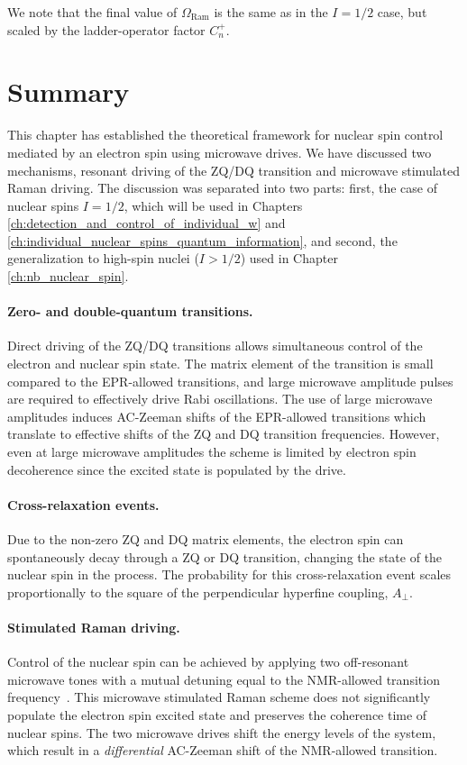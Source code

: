 We note that the final value of $\Omega_{\mathrm{Ram}}$ is the same as in the $I=1/2$ case, but scaled by the ladder-operator factor $C^+_n$.

\section{Summary}

This chapter has established the theoretical framework for nuclear spin control mediated by an electron spin using microwave drives. We have discussed two mechanisms, resonant driving of the ZQ/DQ transition and microwave stimulated Raman driving. The discussion was separated into two parts: first, the case of nuclear spins $I=1/2$, which will be used in Chapters \ref{ch:detection_and_control_of_individual_w} and \ref{ch:individual_nuclear_spins_quantum_information}, and second, the generalization to high-spin nuclei ($I>1/2$) used in Chapter \ref{ch:nb_nuclear_spin}.  

\paragraph{Zero- and double-quantum transitions.} Direct driving of the ZQ/DQ transitions allows simultaneous control of the electron and nuclear spin state. The matrix element of the transition is small compared to the EPR-allowed transitions, and large microwave amplitude pulses are required to effectively drive Rabi oscillations. The use of large microwave amplitudes induces AC-Zeeman shifts of the EPR-allowed transitions which translate to effective shifts of the ZQ and DQ transition frequencies. However, even at large microwave amplitudes the scheme is limited by electron spin decoherence since the excited state is populated by the drive.

\paragraph{Cross-relaxation events.} Due to the non-zero ZQ and DQ matrix elements, the electron spin can spontaneously decay through a ZQ or DQ transition, changing the state of the nuclear spin in the process. The probability for this cross-relaxation event scales proportionally to the square of the perpendicular hyperfine coupling, $A_\perp$.

\paragraph{Stimulated Raman driving.} Control of the nuclear spin can be achieved by applying two off-resonant microwave tones with a mutual detuning equal to the NMR-allowed transition frequency~. This microwave stimulated Raman scheme does not significantly populate the electron spin excited state and preserves the coherence time of nuclear spins. The two microwave drives shift the energy levels of the system, which result in a \textit{differential} AC-Zeeman shift of the NMR-allowed transition.

